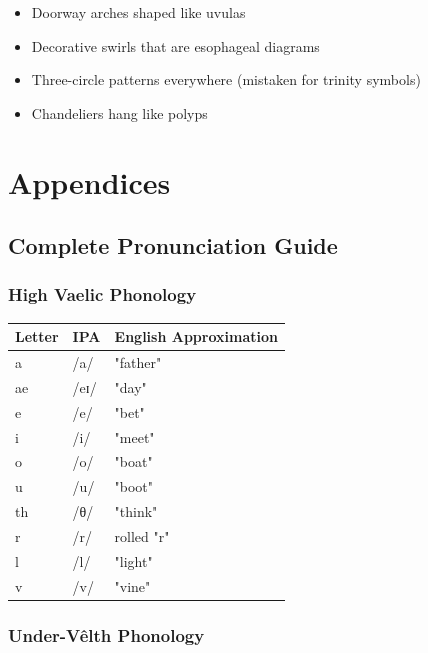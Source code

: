 \documentclass[11pt,a4paper,twoside]{book}
\begin{document}
\begin{itemize}
    \item Doorway arches shaped like uvulas
    \item Decorative swirls that are esophageal diagrams
    \item Three-circle patterns everywhere (mistaken for trinity symbols)
    \item Chandeliers hang like polyps
\end{itemize}

\part{Appendices}

\appendix

\chapter{Complete Pronunciation Guide}

\section{High Vaelic Phonology}

\begin{center}
\begin{tabular}{lll}
\textbf{Letter} & \textbf{IPA} & \textbf{English Approximation} \\
\hline
a & /a/ & "father" \\
ae & /eɪ/ & "day" \\
e & /e/ & "bet" \\
i & /i/ & "meet" \\
o & /o/ & "boat" \\
u & /u/ & "boot" \\
\hline
th & /θ/ & "think" \\
r & /r/ & rolled "r" \\
l & /l/ & "light" \\
v & /v/ & "vine" \\
\end{tabular}
\end{center}

\section{Under-Vêlth Phonology}
\end{document}

